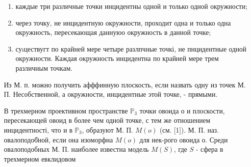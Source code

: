 \documentclass[10pt]{article}
\begin{document}
\begin{enumerate}

  \item каждые три различные точки инцидентны одной и только одной окружности;



  \item через точку, не инцидентную окружности, проходит одна и только одна окружность, пересекающая даннуюо окружность в данной точке;



  \item суıцествугт по крайней мере четыре разлпчные точкі, не пнцидентные одной окружности. Каждая окружность инцидентна по крайней мере трем различным точкам.



\end{enumerate}



Из М. п. можно получить афффинную плоскость, если назвать одну из точек М. П. Несобственной, а окружности, инцидентные этой точке, - прямыми.



В трехмерном проективном пространстве $\mathbb{P}_{3}$ точки овоида о и плоскости, пересекающей овоид в более чем одной точке, с тем же отношением инцидентності, что и в $\mathbb{P}_{3}$, образуют М. П. $M(o)$ (см. [1]). М. П. наз. овалоподоб̈ной, если она изоморфна $M(o)$ для нек-рого овоида о. Среди овалоподобных М. П. наиболее известна модель $M(S)$, где $S$ - сфера в трехмерном евклидовом
\end{document}
